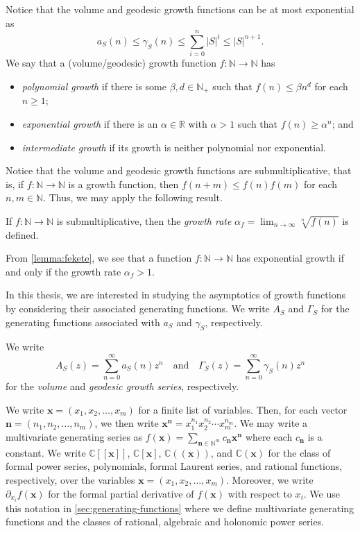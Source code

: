 Notice that the volume and geodesic growth functions can be at most exponential as
\[
		a_S(n)
	\leq
		\gamma_S(n)
	\leq
		\sum_{i=0}^n |S|^{i}
	\leq
		|S|^{n+1}.
\]
We say that a (volume/geodesic) growth function $f \colon \mathbb{N} \to \mathbb{N}$ has
\begin{itemize}
	\item \emph{polynomial growth} if there is some $\beta,d \in \mathbb{N}_+$ such that $f(n) \leq \beta n^d$ for each $n \geq 1$;
	\item \emph{exponential growth} if there is an $\alpha \in \mathbb{R}$ with $\alpha > 1$ such that $f(n) \geq \alpha^n$; and
	\item \emph{intermediate growth} if its growth is neither polynomial nor exponential.
\end{itemize}
Notice that the volume and geodesic growth functions are submultiplicative, that is, if $f\colon \mathbb{N} \to \mathbb{N}$ is a growth function, then $f(n+m) \leq f(n) f(m)$ for each $n,m \in \mathbb{N}$.
Thus, we may apply the following result.

\begin{lemma}\label{lemma:fekete}
	If $f\colon \mathbb{N} \to \mathbb{N}$ is submultiplicative, then the \emph{growth rate}
	$
		\alpha_f = \lim_{n \to \infty} \sqrt[n]{f(n)}
	$ is defined.
\end{lemma}

From \cref{lemma:fekete}, we see that a function $f \colon \mathbb{N} \to \mathbb{N}$ has exponential growth if and only if the growth rate $\alpha_f > 1$.

In this thesis, we are interested in studying the asymptotics of growth functions by considering their associated generating functions.
We write $A_S$ and $\Gamma_S$ for the generating functions associated with $a_S$ and $\gamma_S$, respectively.

\begin{definition}\label{defn:growth-series}
	We write
	\[
	A_S(z) = \sum_{n = 0}^\infty a_S(n) z^n
	\quad\text{and}\quad
	\Gamma_S(z) = \sum_{n = 0}^\infty \gamma_S(n) z^n
	\]
	for the \emph{volume} and \emph{geodesic growth series}, respectively.
\end{definition}

We write $\mathbf{x} = (x_1,x_2,\ldots,x_m)$ for a finite list of variables.
Then, for each vector $\mathbf{n} = (n_1,n_2,\ldots,n_m)$, we then write $\mathbf{x}^\mathbf{n} = x_1^{n_1} x_2^{n_2} \cdots x_m^{n_m}$.
We may write a multivariate generating series as $f(\mathbf{x}) = \sum_{\mathbf{n} \in \mathbb{N}^m} c_\mathbf{n} \mathbf{x}^{\mathbf{n}}$ where each $c_\mathbf{n}$ is a constant.
We write $\mathbb{C}[[\mathbf{x}]]$, $\mathbb{C}[\mathbf{x}]$, $\mathbb{C}((\mathbf{x}))$, and $\mathbb{C}(\mathbf{x})$ for the class of formal power series, polynomials, formal Laurent series, and rational functions, respectively, over the variables $\mathbf{x} = (x_1,x_2,\ldots,x_m)$.
Moreover, we write $\partial_{x_i} f(\mathbf{x})$ for the formal partial derivative of $f(\mathbf{x})$ with respect to $x_i$.
We use this notation in \cref{sec:generating-functions} where we define multivariate generating functions and the classes of rational, algebraic and holonomic power series.

